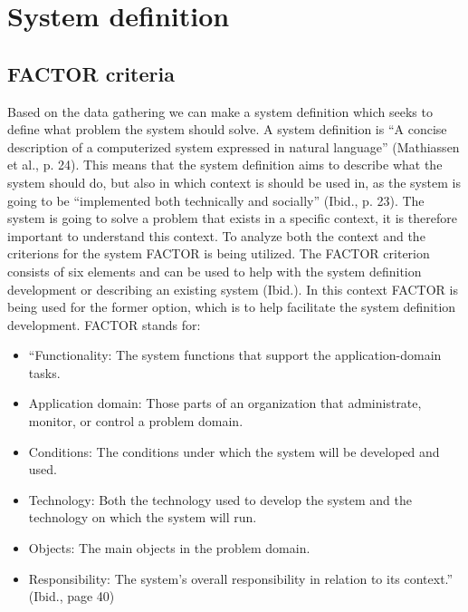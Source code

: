 \section{System definition}
\subsection{FACTOR criteria}

Based on the data gathering we can make a system definition which seeks to define what problem the system should solve. A system definition is “A concise description of a computerized system expressed in natural language” (Mathiassen et al., p. 24). This means that the system definition aims to describe what the system should do, but also in which context is should be used in, as the system is going to be “implemented both technically and socially” (Ibid., p. 23). The system is going to solve a problem that exists in a specific context, it is therefore important to understand this context.
To analyze both the context and the criterions for the system FACTOR is being utilized. The FACTOR criterion consists of six elements and can be used to help with the system definition development or describing an existing system (Ibid.). In this context FACTOR is being used for the former option, which is to help facilitate the system definition development. FACTOR stands for:

\begin{itemize}
\item “Functionality: The system functions that support the application-domain tasks.

\item Application domain: Those parts of an organization that administrate, monitor, or control a problem domain.

\item Conditions: The conditions under which the system will be developed and used.

\item Technology: Both the technology used to develop the system and the technology on which the system will run.

\item Objects: The main objects in the problem domain.

\item Responsibility: The system’s overall responsibility in relation to its context.” (Ibid., page 40)
\end{itemize}

